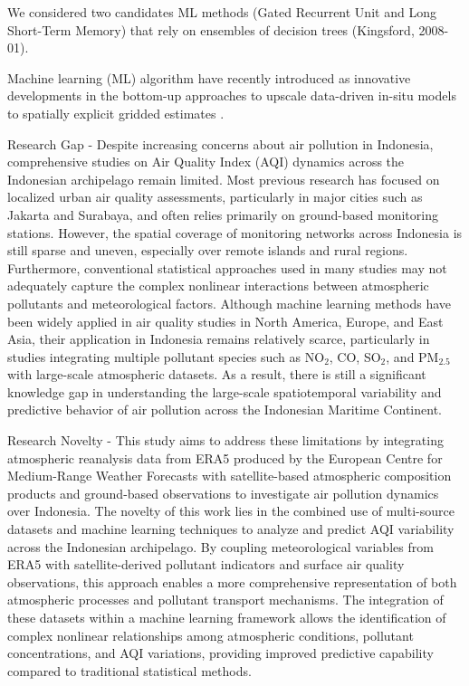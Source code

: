 \documentclass[pdflatex,sn-mathphys-num]{sn-jnl}%
\theoremstyle{thmstyleone}%
\theoremstyle{thmstyletwo}%
\theoremstyle{thmstylethree}%
\begin{document}
We considered two candidates ML methods (Gated Recurrent Unit and Long Short-Term Memory) that rely on ensembles of decision trees (Kingsford, 2008-01). 

Machine learning (ML) algorithm have recently introduced as innovative developments in the bottom-up approaches to upscale data-driven in-situ models to spatially explicit gridded estimates \cite{Son2023}.

Research Gap - Despite increasing concerns about air pollution in Indonesia, comprehensive studies on Air Quality Index (AQI) dynamics across the Indonesian archipelago remain limited. Most previous research has focused on localized urban air quality assessments, particularly in major cities such as Jakarta and Surabaya, and often relies primarily on ground-based monitoring stations. However, the spatial coverage of monitoring networks across Indonesia is still sparse and uneven, especially over remote islands and rural regions. Furthermore, conventional statistical approaches used in many studies may not adequately capture the complex nonlinear interactions between atmospheric pollutants and meteorological factors. Although machine learning methods have been widely applied in air quality studies in North America, Europe, and East Asia, their application in Indonesia remains relatively scarce, particularly in studies integrating multiple pollutant species such as NO$_2$, CO, SO$_2$, and PM$_{2.5}$ with large-scale atmospheric datasets. As a result, there is still a significant knowledge gap in understanding the large-scale spatiotemporal variability and predictive behavior of air pollution across the Indonesian Maritime Continent.

Research Novelty - This study aims to address these limitations by integrating atmospheric reanalysis data from ERA5 produced by the European Centre for Medium-Range Weather Forecasts with satellite-based atmospheric composition products and ground-based observations to investigate air pollution dynamics over Indonesia. The novelty of this work lies in the combined use of multi-source datasets and machine learning techniques to analyze and predict AQI variability across the Indonesian archipelago. By coupling meteorological variables from ERA5 with satellite-derived pollutant indicators and surface air quality observations, this approach enables a more comprehensive representation of both atmospheric processes and pollutant transport mechanisms. The integration of these datasets within a machine learning framework allows the identification of complex nonlinear relationships among atmospheric conditions, pollutant concentrations, and AQI variations, providing improved predictive capability compared to traditional statistical methods.
\end{document}
